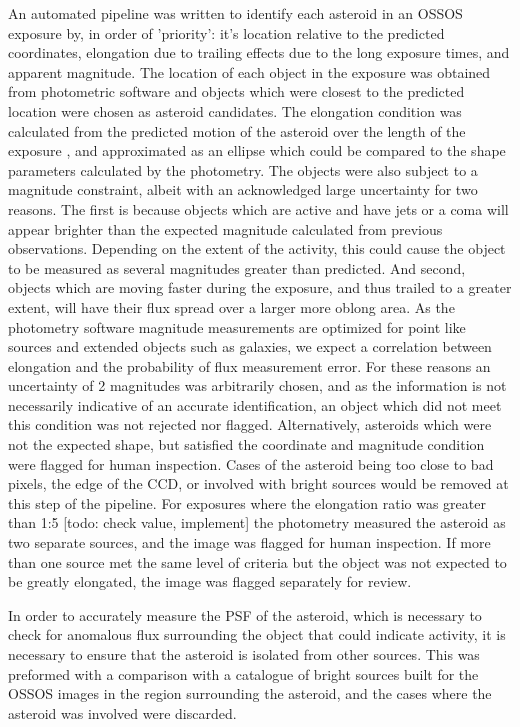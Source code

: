 \documentclass[iop,apj]{emulateapj}
\begin{document}
An automated pipeline was written to identify each asteroid in an OSSOS exposure by, in order of 'priority': it's location relative to the predicted coordinates,  elongation due to trailing effects due to the long exposure times, and apparent magnitude. The location of each object in the exposure was obtained from photometric software \citep{sep} and objects which were closest to the predicted location were chosen as asteroid candidates. The elongation condition was calculated from the predicted motion of the asteroid over the length of the exposure \citep{jpl}, and approximated as an ellipse which could be compared to the shape parameters calculated by the photometry. The objects were also subject to a magnitude constraint, albeit with an acknowledged large uncertainty for two reasons. The first is because objects which are active and have jets or a coma will appear brighter than the expected magnitude calculated from previous observations. Depending on the extent of the activity, this could cause the object to be measured as several magnitudes greater than predicted.
And second, objects which are moving faster during the exposure, and thus trailed to a greater extent, will have their flux spread over a larger more oblong area. As the photometry software magnitude measurements are optimized for point like sources and extended objects such as galaxies, we expect a correlation between elongation and the probability of flux measurement error. For these reasons an uncertainty of 2 magnitudes was arbitrarily chosen, and as the information is not necessarily indicative of an accurate identification, an object which did not meet this condition was not rejected nor flagged. Alternatively, asteroids which were not the expected shape, but satisfied the coordinate and magnitude condition were flagged for human inspection. 
Cases of the asteroid being too close to bad pixels, the edge of the CCD, or involved with bright sources would be removed at this step of the pipeline. For exposures where the elongation ratio was greater than 1:5 [todo: check value, implement] the photometry measured the asteroid as two separate sources, and the image was flagged for human inspection. If more than one source met the same level of criteria but the object was not expected to be greatly elongated, the image was flagged separately for review.

In order to accurately measure the PSF of the asteroid, which is necessary to check for anomalous flux surrounding the object that could indicate activity, it is necessary to ensure that the asteroid is isolated from other sources. This was preformed with a comparison with a catalogue of bright sources built for the OSSOS images \citep{ossos} in the region surrounding the asteroid, and the cases where the asteroid was involved were discarded.
\end{document}
